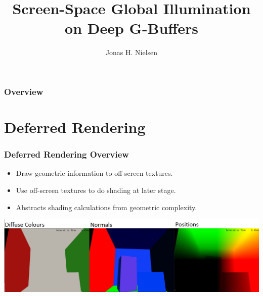 \documentclass{beamer}
\title[Global Illumination]{Screen-Space Global Illumination on Deep G-Buffers} %
\author{Jonas H. Nielsen} %
\institute[DTU Compute] %
\begin{document}
\begin{frame}
\titlepage %
\end{frame}

\begin{frame}
\frametitle{Overview} %
\tableofcontents %
\end{frame}


\section{Deferred Rendering} 

\begin{frame}
\frametitle{Deferred Rendering Overview}
\begin{itemize}
\item Draw geometric information to off-screen textures.
\item Use off-screen textures to do shading at later stage.
\item Abstracts shading calculations from geometric complexity.
\end{itemize}

\begin{center}
\includegraphics[scale=0.2]{img/def-rend/all}
\end{center}
\end{frame}
\end{document}
